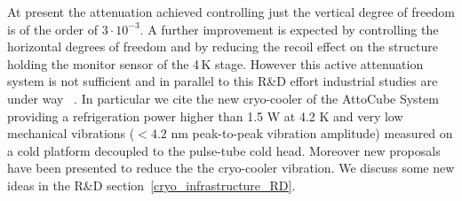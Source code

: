 At present the attenuation achieved controlling just the vertical degree of freedom is of the order of $3 \cdot 10^{-3}$.  A further improvement is expected by controlling the horizontal  degrees of freedom and by reducing the recoil effect on the structure holding the monitor sensor of the 4\,K stage. However this active attenuation system is not sufficient and in parallel to this R\&D effort  industrial studies  are under way~\cite{Riabzev} . In particular we cite   the new cryo-cooler  of the AttoCube System \cite{attocube} providing a refrigeration power higher than 1.5 W at 4.2 K  and  very low mechanical vibrations ($< 4.2$ nm peak-to-peak vibration amplitude) measured on a cold  platform decoupled to the pulse-tube cold head.
\noindent
 Moreover new proposals  have been presented \cite{Suzuki_2006}  to reduce the  the cryo-cooler vibration. We discuss  some new ideas in the R\&D section~\ref{cryo_infrastructure_RD}.
 

